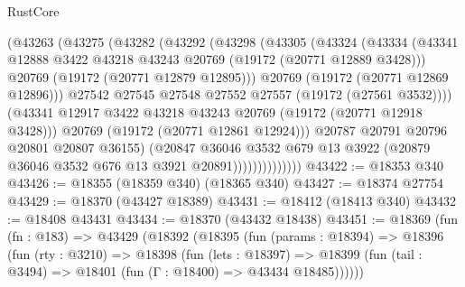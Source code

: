 \begin{lexlean}{RustCore}
\begin{coremodule}
                        (@43263
                          (@43275
                            (@43282
                              (@43292
                                (@43298
                                  (@43305
                                    (@43324
                                      (@43334
                                        (@43341
                                          @12888
                                          @3422
                                          @43218
                                          @43243
                                          @20769
                                          (@19172 (@20771 @12889 @3428)))
                                        @20769
                                        (@19172 (@20771 @12879 @12895)))
                                      @20769
                                      (@19172 (@20771 @12869 @12896)))
                                    @27542
                                    @27545
                                    @27548
                                    @27552
                                    @27557
                                    (@19172 (@27561 @3532))))
                                (@43341
                                  @12917
                                  @3422
                                  @43218
                                  @43243
                                  @20769
                                  (@19172 (@20771 @12918 @3428)))
                                @20769
                                (@19172 (@20771 @12861 @12924)))
                              @20787
                              @20791
                              @20796
                              @20801
                              @20807
                              @36155)
                            (@20847
                              @36046
                              @3532
                              @679
                              @13
                              @3922
                              (@20879 @36046 @3532 @676 @13 @3921 @20891))))))))))))))
@43422 := @18353 @340
@43426 := @18355 (@18359 @340) (@18365 @340)
@43427 := @18374 @27754
@43429 := @18370 (@43427 @18389)
@43431 := @18412 (@18413 @340)
@43432 := @18408 @43431
@43434 := @18370 (@43432 @18438)
@43451 := @18369
    (fun (fn : @183) =>
    @43429
      (@18392
        (@18395
          (fun (params : @18394) =>
          @18396
            (fun (rty : @3210) =>
            @18398
              (fun (lets : @18397) =>
              @18399 (fun (tail : @3494) => @18401 (fun (Γ : @18400) => @43434 @18485))))))

\end{coremodule}
\end{lexlean}
